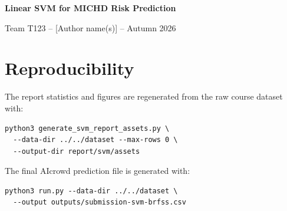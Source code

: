 \documentclass[10pt,a4paper]{article}
\begin{document}
\begin{center}
  {\LARGE\bfseries Linear SVM for MICHD Risk Prediction\par}
  \vspace{4pt}
  {\normalsize Team T123 -- [Author name(s)] -- Autumn 2026}
\end{center}

\begin{abstract}
We developed a NumPy-only linear soft-margin SVM for predicting myocardial
infarction or coronary heart disease from the imbalanced BRFSS survey data.
Codebook-aware missing-value handling and categorical encoding were combined
with positive-class-weighted hinge loss. On a complete-data stratified holdout,
threshold zero achieved 0.7710 balanced accuracy, 0.7284 recall, and 0.3989 F1.
Selecting threshold 0.5009 by validation F1 yielded local F1 0.432 and accuracy
0.868; the hidden-test AIcrowd result (F1 0.431, accuracy 0.866) closely matched
these values, providing a reproducible SVM contribution for the group report.
\end{abstract}



\section*{Reproducibility}

The report statistics and figures are regenerated from the raw course dataset
with:
\begin{verbatim}
python3 generate_svm_report_assets.py \
  --data-dir ../../dataset --max-rows 0 \
  --output-dir report/svm/assets
\end{verbatim}
The final AIcrowd prediction file is generated with:
\begin{verbatim}
python3 run.py --data-dir ../../dataset \
  --output outputs/submission-svm-brfss.csv
\end{verbatim}
\end{document}
